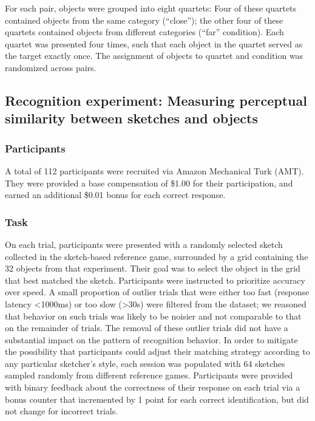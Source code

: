 \documentclass[9pt,twocolumn,twoside]{pnas-new}
\newcommand{\mwu}[1]{{\color{green}{[mwu: #1]}}}
\begin{document}
{For each pair, objects were grouped into eight quartets: Four of these quartets contained objects from the same category (``close''); the other four of these quartets contained objects from different categories (``far'' condition). \mwu{show picture of each condition?} Each quartet was presented four times, such that each object in the quartet served as the target exactly once. The assignment of objects to quartet and condition was randomized across pairs.

\subsection*{Recognition experiment: Measuring perceptual similarity between sketches and objects}

\subsubsection*{Participants}

A total of 112 participants were recruited via Amazon Mechanical Turk (AMT). They were provided a base compensation of \$1.00 for their participation, and earned an additional \$0.01 bonus for each correct response.

\subsubsection*{Task}

On each trial, participants were presented with a randomly selected sketch collected in the sketch-based reference game, surrounded by a grid containing the 32 objects from that experiment. Their goal was to select the object in the grid that best matched the sketch. Participants were instructed to prioritize accuracy over speed. A small proportion of outlier trials that were either too fast (response latency <1000ms) or too slow (>30s) were filtered from the dataset; we reasoned that behavior on such trials was likely to be noisier and not comparable to that on the remainder of trials.\mwu{is this kosher?} The removal of these outlier trials did not have a substantial impact on the pattern of recognition behavior. In order to mitigate the possibility that participants could adjust their matching strategy according to any particular sketcher's style, each session was populated with 64 sketches sampled randomly from different reference games. Participants were provided with binary feedback about the correctness of their response on each trial via a bonus counter that incremented by 1 point for each correct identification, but did not change for incorrect trials.

}
\end{document}
